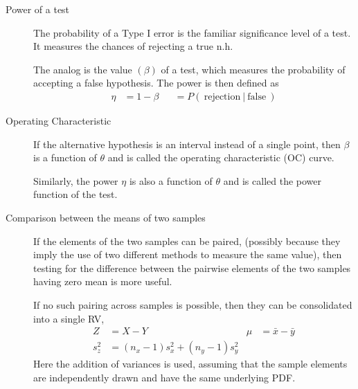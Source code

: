\begin{description}
    \item[Power of a test] The probability of a Type I error is the familiar
          significance level of a test. It measures the chances of rejecting a true n.h.
          \par
          The analog is the value $ (\beta) $ of a test, which measures the probability
          of accepting a false hypothesis. The power is then defined as
          \begin{align}
              \eta & = 1 - \beta &  & = P(\ \text{rejection}\ |\ \text{false}\ )
          \end{align}

    \item[Operating Characteristic] If the alternative hypothesis is an interval instead
          of a single point, then $ \beta $ is a function of $ \theta $ and is called the
          operating characteristic (OC) curve. \par
          Similarly, the power $ \eta $ is also a function of $ \theta $ and is called
          the power function of the test.

    \item[Comparison between the means of two samples] If the elements of the two samples
          can be paired, (possibly because they imply the use of two different methods to
          measure the same value), then testing for the difference between the pairwise
          elements of the two samples having zero mean is more useful. \par
          If no such pairing across samples is possible, then they can be consolidated
          into a single RV,
          \begin{align}
              Z     & = X - Y                           &
              \mu   & = \bar{x} - \bar{y}                 \\
              s_z^2 & = (n_x - 1)s_x^2 + (n_y - 1)s_y^2
          \end{align}
          Here the addition of variances is used, assuming that the sample elements are
          independently drawn and have the same underlying PDF.


\end{description}
